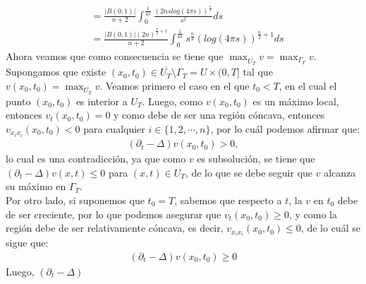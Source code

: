 \begin{homeworkProblem}
\begin{solucion}
\begin{align*}
      &= \frac{|B(0,1)|}{n+2} \int_{0}^{\frac{1}{4\pi}} \frac{(2nslog(4\pi s))^{\frac{n}{2}}}{s^{2}} ds\\
      &= \frac{|B(0,1)|(2n)^{\frac{n}{2}+1}}{n+2} \int_{0}^{\frac{1}{4\pi}} s^{\frac{n}{2}} (log(4\pi s))^{\frac{n}{2}+1} ds
    \end{align*}
    \demostrado
    Ahora veamos que como consecuencia se tiene que $\max_{\overline{U_T}}v=\max_{\Gamma_T}v$.\\
    Supongamos que existe $(x_0,t_0)\in\overline{U_T}\setminus\Gamma_T=U\times (0,T]$ tal que $v(x_0,t_0)=\max_{\overline{U_T}}v$. Veamos primero el caso en el que $t_0<T$, en el cual el punto $(x_0,t_0)$ es interior a $U_T$. Luego, como $v(x_0,t_0)$ es un máximo local, entonces $v_t(x_0,t_0)=0$ y como debe de ser una región cóncava, entonces $v_{x_ix_i}(x_0,t_0)<0$ para cualquier $i\in\{1,2,\cdots,n\}$, por lo cuál podemos afirmar que:
    \begin{align*}
      (\partial_t-\Delta)v(x_0,t_0)> 0,
    \end{align*}
    lo cual es una contradicción, ya que como $v$ es subsolución, se tiene que $(\partial_t-\Delta)v(x,t)\leq 0$ para $(x,t)\in U_T$, de lo que se debe seguir que $v$ alcanza su máximo en $\Gamma_T$.\\
    Por otro lado, si suponemos que $t_0=T$, sabemos que respecto a $t$, la $v$ en $t_0$ debe de ser creciente, por lo que podemos asegurar que $v_t(x_0,t_0)\geq 0$, y como la región debe de ser relativamente cóncava, es decir, $v_{x_ix_i}(x_0,t_0)\leq 0$, de lo cuál se sigue que:
    \begin{align*}
      (\partial_t-\Delta)v(x_0,t_0)\geq 0
    \end{align*}
    Luego, $(\partial_{t}-\Delta)$
  \end{solucion}  
\end{homeworkProblem}
